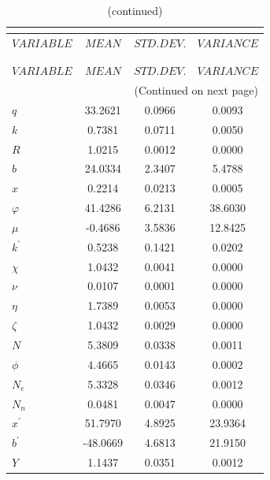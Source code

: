  
\begin{center}
\begin{longtable}{lccc} 
\caption{THEORETICAL MOMENTS}\\
 \label{Table:th_moments}\\
\toprule 
$VARIABLE  $	 & 	 $         MEAN$	 & 	 $    STD. DEV.$	 & 	 $     VARIANCE$\\
\midrule \endfirsthead 
\caption{(continued)}\\
 \toprule \\ 
$VARIABLE  $	 & 	 $         MEAN$	 & 	 $    STD. DEV.$	 & 	 $     VARIANCE$\\
\midrule \endhead 
\midrule \multicolumn{4}{r}{(Continued on next page)} \\ \bottomrule \endfoot 
\bottomrule \endlastfoot 
$q         $	 & 	      33.2621	 & 	       0.0966	 & 	       0.0093 \\ 
$k         $	 & 	       0.7381	 & 	       0.0711	 & 	       0.0050 \\ 
$R         $	 & 	       1.0215	 & 	       0.0012	 & 	       0.0000 \\ 
$b         $	 & 	      24.0334	 & 	       2.3407	 & 	       5.4788 \\ 
$x         $	 & 	       0.2214	 & 	       0.0213	 & 	       0.0005 \\ 
$\varphi   $	 & 	      41.4286	 & 	       6.2131	 & 	      38.6030 \\ 
$\mu       $	 & 	      -0.4686	 & 	       3.5836	 & 	      12.8425 \\ 
$k^\prime  $	 & 	       0.5238	 & 	       0.1421	 & 	       0.0202 \\ 
$\chi      $	 & 	       1.0432	 & 	       0.0041	 & 	       0.0000 \\ 
$\nu       $	 & 	       0.0107	 & 	       0.0001	 & 	       0.0000 \\ 
$\eta      $	 & 	       1.7389	 & 	       0.0053	 & 	       0.0000 \\ 
$\zeta     $	 & 	       1.0432	 & 	       0.0029	 & 	       0.0000 \\ 
$N         $	 & 	       5.3809	 & 	       0.0338	 & 	       0.0011 \\ 
$\phi      $	 & 	       4.4665	 & 	       0.0143	 & 	       0.0002 \\ 
$N_e       $	 & 	       5.3328	 & 	       0.0346	 & 	       0.0012 \\ 
$N_n       $	 & 	       0.0481	 & 	       0.0047	 & 	       0.0000 \\ 
$x^\prime  $	 & 	      51.7970	 & 	       4.8925	 & 	      23.9364 \\ 
$b^\prime  $	 & 	     -48.0669	 & 	       4.6813	 & 	      21.9150 \\ 
$Y         $	 & 	       1.1437	 & 	       0.0351	 & 	       0.0012 \\ 
\end{longtable}
 \end{center}
